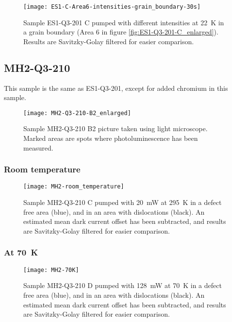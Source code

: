 \begin{figure}[H]
\centering
\texttt{[image: ES1-C-Area6-intensities-grain\_boundary-30s]}
\caption[ES1-Q3-201 at a grain boundary]{Sample ES1-Q3-201 C pumped with different intensities at 22~K in a grain boundary (Area 6 in figure \ref{fig:ES1-Q3-201-C_enlarged}). Results are Savitzky-Golay filtered for easier comparison.}
\label{fig:ES1-C-Area6-intensities-grain_boundary-30s}%
\end{figure}





\subsection{MH2-Q3-210}

This sample is the same as ES1-Q3-201, except for added chromium in this sample.



\begin{figure}[H]
\centering
\texttt{[image: MH2-Q3-210-B2\_enlarged]}
\caption[MH2-Q3-210 B2 from light microscope]{Sample MH2-Q3-210 B2 picture taken using light microscope. Marked areas are spots where photoluminescence has been measured.}
\label{fig:MH2-Q3-210-B2_enlarged}%
\end{figure}



\subsubsection{Room temperature}

\begin{figure}[H]
\centering
\texttt{[image: MH2-room\_temperature]}
\caption[MH2-Q3-210 at room temperature]{Sample MH2-Q3-210 C pumped with 20~mW at 295~K in a defect free area (blue), and in an area with dislocations (black). An estimated mean dark current offset has been subtracted, and results are Savitzky-Golay filtered for easier comparison.}
\label{fig:MH2-room_temperature}%
\end{figure}

\subsubsection{At 70~K}
\begin{figure}[H]
\centering
\texttt{[image: MH2-70K]}
\caption[MH2-Q3-210 at 70K]{Sample MH2-Q3-210 D pumped with 128~mW at 70~K in a defect free area (blue), and in an area with dislocations (black). An estimated mean dark current offset has been subtracted, and results are Savitzky-Golay filtered for easier comparison.}
\label{fig:MH2-70K}%
\end{figure}

